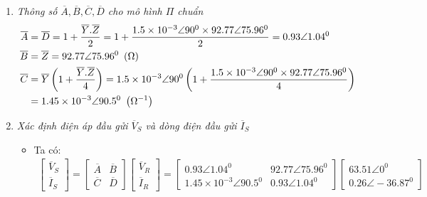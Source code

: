 \begin{enumerate}
\begin{enumerate}[\it a.]
				\item \emph{Thông số $\overline{A}, \overline{B}, \overline{C}, \overline{D}$ cho mô hình $\Pi$ chuẩn}				
					\begin{align*}
						\overline{A} 	& = \overline{D}  = 1 + \dfrac{\overline{Y}.\overline{Z}}{2} = 1 + \dfrac{1.5 \times 10^{-3} \angle 90^0 \times 92.77 \angle 75.96^0}{2} = 0.93 \angle 1.04^0\\
						 \overline{B} & = \overline{Z} =92.77 \angle 75.96^0  ~\left({\Omega}\right) \\ 
						 \overline{C} & = \overline{Y} \left({1+\dfrac{\overline{Y}.\overline{Z}}{4}}\right)= 1.5 \times 10^{-3} \angle 90^0  \left({1 + \dfrac{1.5 \times 10^{-3} \angle 90^0 \times 92.77 \angle 75.96^0}{4}}\right) \\ 
						 & = 1.45 \times 10^{-3} \angle 90.5^0~\left({\Omega^{-1}}\right)
					\end{align*}				
				
				\item \emph{Xác định điện áp đầu gửi $\overline{V}_S$ và dòng điện đầu gửi $\overline{I}_S$}
					\begin{itemize}
						\item Ta có: 
							\begin{align*}
								\left[{\begin{array}{c}
								\overline{V}_S\\
								\overline{I}_S
								\end{array}
								}\right]
								= 
								\left[{\begin{array}{cc}
								\overline{A} & \overline{B}\\
								\overline{C} & \overline{D}
								\end{array}
								}\right]				
							\left[{\begin{array}{c}
							\overline{V}_R\\
							\overline{I}_R
							\end{array}
							}\right]
							= \left[{\begin{array}{cc}
								 0.93 \angle 1.04^0 & 92.77 \angle 75.96^0\\
								1.45 \times 10^{-3} \angle 90.5^0 &  0.93 \angle 1.04^0
								\end{array}
								}\right]				
							\left[{\begin{array}{c}
							63.51 \angle 0^0\\
							0.26 \angle -36.87^0
							\end{array}
							}\right]
						\end{align*}
						

\end{itemize}
\end{enumerate}
\end{enumerate}
